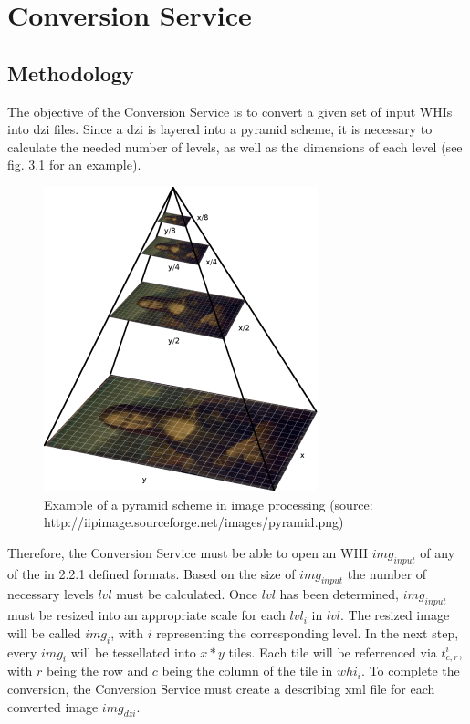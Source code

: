 \chapter{Conversion Service}

\section{Methodology}

The objective of the Conversion Service is to convert a given set of input WHIs into dzi files. Since a dzi is layered into a pyramid scheme, it is necessary to calculate the needed number of levels, as well as the dimensions of each level (see fig. 3.1 for an example).

\begin{figure}[H]
	\begin{center}
		\includegraphics[scale=0.5]{img/pyramid.png}
		\caption{Example of a pyramid scheme in image processing (source: http://iipimage.sourceforge.net/images/pyramid.png)}
		\label{fig:fig3.1}
	\end{center}
\end{figure}

Therefore, the Conversion Service must be able to open an WHI $img_{input}$ of any of the in 2.2.1 defined formats. Based on the size of $img_{input}$ the number of necessary levels $lvl$ must be calculated. Once $lvl$ has been determined, $img_{input}$ must be resized into an appropriate scale for each $lvl_i$ in $lvl$. The resized image will be called $img_i$, with $i$ representing the corresponding level. In the next step, every $img_i$ will be tessellated into $x*y$ tiles. Each tile will be referrenced via $t^i_{c,r}$, with $r$ being the row and $c$ being the column of the tile in $whi_i$. To complete the conversion, the Conversion Service must create a describing xml file for each converted image $img_{dzi}$.


